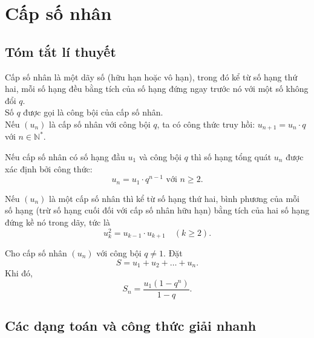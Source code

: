\newpage
\section{Cấp số nhân}
\subsection{Tóm tắt lí thuyết}
\begin{dn}
	Cấp số nhân là một dãy số (hữu hạn hoặc vô hạn), trong đó kể từ số hạng thứ hai, mỗi số hạng đều bằng tích của số hạng đứng ngay trước nó với một số không đổi  $q$.\\
	Số $q$ được gọi là công bội của cấp số nhân.\\
	Nếu $(u_n)$ là cấp số nhân với công bội $q$, ta có công thức truy hồi: $u_{n+1} =u_n \cdot q$ với $n \in \mathbb{N^*}$.
\end{dn}
\begin{dl}
	Nếu cấp số nhân có số hạng đầu $u_1$ và công bội $q$ thì số hạng tổng quát $u_n$ được xác định bởi công thức: $$u_n=u_1\cdot q^{n-1} \text{ với } n \ge 2.$$
\end{dl}
\begin{dl}
	Nếu $(u_n)$ là một cấp số nhân thì kể từ số hạng thứ hai, bình phương của mỗi số hạng (trừ số hạng cuối đối với cấp số nhân hữu hạn) bằng tích của hai số hạng đứng kề nó trong dãy, tức là $$u_k^2=u_{k-1}\cdot u_{k+1} \quad (k \ge 2).$$
\end{dl}
\begin{dl}
	Cho cấp số nhân $(u_n)$ với công bội $q \ne 1$. Đặt $$S=u_1+u_2+\dots + u_n.$$
	Khi đó, $$S_n=\dfrac{u_1\left(1-q^n\right)}{1-q}.$$
\end{dl}
\subsection{Các dạng toán và công thức giải nhanh}

